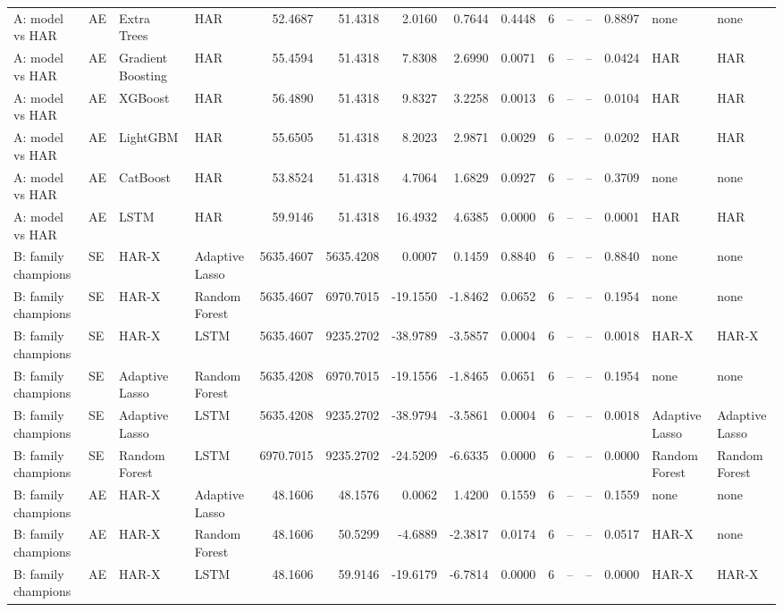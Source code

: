 \begin{table}[htbp]
{\begin{tabular}{llllrrrrrrrrrll}
A: model vs HAR & AE & Extra Trees & HAR & 52.4687 & 51.4318 & 2.0160 & 0.7644 & 0.4448 & 6 & -- & -- & 0.8897 & none & none \\
A: model vs HAR & AE & Gradient Boosting & HAR & 55.4594 & 51.4318 & 7.8308 & 2.6990 & 0.0071 & 6 & -- & -- & 0.0424 & HAR & HAR \\
A: model vs HAR & AE & XGBoost & HAR & 56.4890 & 51.4318 & 9.8327 & 3.2258 & 0.0013 & 6 & -- & -- & 0.0104 & HAR & HAR \\
A: model vs HAR & AE & LightGBM & HAR & 55.6505 & 51.4318 & 8.2023 & 2.9871 & 0.0029 & 6 & -- & -- & 0.0202 & HAR & HAR \\
A: model vs HAR & AE & CatBoost & HAR & 53.8524 & 51.4318 & 4.7064 & 1.6829 & 0.0927 & 6 & -- & -- & 0.3709 & none & none \\
A: model vs HAR & AE & LSTM & HAR & 59.9146 & 51.4318 & 16.4932 & 4.6385 & 0.0000 & 6 & -- & -- & 0.0001 & HAR & HAR \\
B: family champions & SE & HAR-X & Adaptive Lasso & 5635.4607 & 5635.4208 & 0.0007 & 0.1459 & 0.8840 & 6 & -- & -- & 0.8840 & none & none \\
B: family champions & SE & HAR-X & Random Forest & 5635.4607 & 6970.7015 & -19.1550 & -1.8462 & 0.0652 & 6 & -- & -- & 0.1954 & none & none \\
B: family champions & SE & HAR-X & LSTM & 5635.4607 & 9235.2702 & -38.9789 & -3.5857 & 0.0004 & 6 & -- & -- & 0.0018 & HAR-X & HAR-X \\
B: family champions & SE & Adaptive Lasso & Random Forest & 5635.4208 & 6970.7015 & -19.1556 & -1.8465 & 0.0651 & 6 & -- & -- & 0.1954 & none & none \\
B: family champions & SE & Adaptive Lasso & LSTM & 5635.4208 & 9235.2702 & -38.9794 & -3.5861 & 0.0004 & 6 & -- & -- & 0.0018 & Adaptive Lasso & Adaptive Lasso \\
B: family champions & SE & Random Forest & LSTM & 6970.7015 & 9235.2702 & -24.5209 & -6.6335 & 0.0000 & 6 & -- & -- & 0.0000 & Random Forest & Random Forest \\
B: family champions & AE & HAR-X & Adaptive Lasso & 48.1606 & 48.1576 & 0.0062 & 1.4200 & 0.1559 & 6 & -- & -- & 0.1559 & none & none \\
B: family champions & AE & HAR-X & Random Forest & 48.1606 & 50.5299 & -4.6889 & -2.3817 & 0.0174 & 6 & -- & -- & 0.0517 & HAR-X & none \\
B: family champions & AE & HAR-X & LSTM & 48.1606 & 59.9146 & -19.6179 & -6.7814 & 0.0000 & 6 & -- & -- & 0.0000 & HAR-X & HAR-X \\

\end{tabular}}
\end{table}
